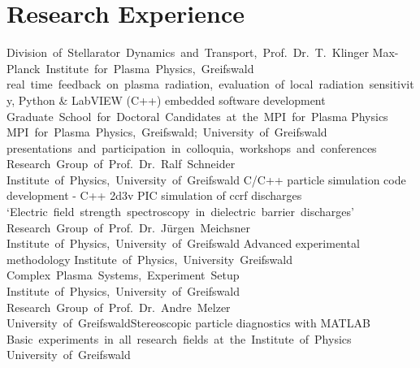 \documentclass[11pt,a4paper]{moderncv}
\begin{document}
\section{Research Experience}
%
{Division~of~Stellarator~Dynamics~and~Transport,~Prof.~Dr.~T.~Klinger\newline}{}%
{Max-Planck~Institute~for~Plasma~Physics,~Greifswald\newline}%
{real~time~feedback~on~plasma~radiation,~evaluation~of~local~radiation~sensitivity, Python \& LabVIEW (C++) embedded software development}
%
{Graduate~School~for~Doctoral~Candidates~at~the~MPI~for~Plasma Physics\newline}{}%
{MPI~for~Plasma~Physics,~Greifswald;~University~of~Greifswald\newline}%
{presentations~and~participation~in~colloquia,~workshops~and~conferences}
%
{Research~Group~of~Prof.~Dr.~Ralf~Schneider\newline}{}%
{Institute~of~Physics,~University~of~Greifswald\newline}%
{C/C++ particle simulation code development - C++ 2d3v PIC simulation of ccrf discharges}
%
{`Electric~field~strength~spectroscopy~in~dielectric~barrier~discharges'\newline}{}%
{Research~Group~of~Prof.~Dr.~Jürgen~Meichsner\newline}%
{Institute~of~Physics,~University~of~Greifswald}
%
{Advanced experimental methodology\newline}{}%
{Institute~of~Physics,~University~Greifswald}{}
%
{Complex~Plasma~Systems,~Experiment~Setup\newline}{}%
{Institute~of~Physics,~University~of~Greifswald}{}
%
{Research~Group~of~Prof.~Dr.~Andre~Melzer\newline}{}%
{University~of~Greifswald\newline}{Stereoscopic particle diagnostics with MATLAB}
%
{Basic~experiments~in~all~research~fields~at~the~Institute~of~Physics\newline}{}%
{University~of~Greifswald}{}
\end{document}
